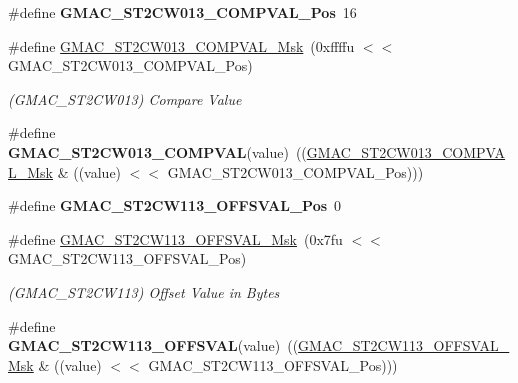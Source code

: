 \begin{DoxyCompactItemize}
\item 
\mbox{\label{group__SAMV71__GMAC_ga8e63dcd8385fa2aabb39af0bfb3d267a}} 
\#define {\bfseries G\+M\+A\+C\+\_\+\+S\+T2\+C\+W013\+\_\+\+C\+O\+M\+P\+V\+A\+L\+\_\+\+Pos}~16
\item 
\mbox{\label{group__SAMV71__GMAC_ga7d7fdcea04ba2bf079cc7801d1ef855a}} 
\#define \mbox{\hyperlink{group__SAMV71__GMAC_ga7d7fdcea04ba2bf079cc7801d1ef855a}{G\+M\+A\+C\+\_\+\+S\+T2\+C\+W013\+\_\+\+C\+O\+M\+P\+V\+A\+L\+\_\+\+Msk}}~(0xffffu $<$$<$ G\+M\+A\+C\+\_\+\+S\+T2\+C\+W013\+\_\+\+C\+O\+M\+P\+V\+A\+L\+\_\+\+Pos)
\begin{DoxyCompactList}\small\item\em (G\+M\+A\+C\+\_\+\+S\+T2\+C\+W013) Compare Value \end{DoxyCompactList}\item 
\mbox{\label{group__SAMV71__GMAC_gad017fa8197911182892a098e657eaaba}} 
\#define {\bfseries G\+M\+A\+C\+\_\+\+S\+T2\+C\+W013\+\_\+\+C\+O\+M\+P\+V\+AL}(value)~((\mbox{\hyperlink{group__SAMV71__GMAC_ga7d7fdcea04ba2bf079cc7801d1ef855a}{G\+M\+A\+C\+\_\+\+S\+T2\+C\+W013\+\_\+\+C\+O\+M\+P\+V\+A\+L\+\_\+\+Msk}} \& ((value) $<$$<$ G\+M\+A\+C\+\_\+\+S\+T2\+C\+W013\+\_\+\+C\+O\+M\+P\+V\+A\+L\+\_\+\+Pos)))
\item 
\mbox{\label{group__SAMV71__GMAC_gaa0e0b9bd4b2ba614240358f6e471edae}} 
\#define {\bfseries G\+M\+A\+C\+\_\+\+S\+T2\+C\+W113\+\_\+\+O\+F\+F\+S\+V\+A\+L\+\_\+\+Pos}~0
\item 
\mbox{\label{group__SAMV71__GMAC_ga798c1052db3859641ebedee42e9f9305}} 
\#define \mbox{\hyperlink{group__SAMV71__GMAC_ga798c1052db3859641ebedee42e9f9305}{G\+M\+A\+C\+\_\+\+S\+T2\+C\+W113\+\_\+\+O\+F\+F\+S\+V\+A\+L\+\_\+\+Msk}}~(0x7fu $<$$<$ G\+M\+A\+C\+\_\+\+S\+T2\+C\+W113\+\_\+\+O\+F\+F\+S\+V\+A\+L\+\_\+\+Pos)
\begin{DoxyCompactList}\small\item\em (G\+M\+A\+C\+\_\+\+S\+T2\+C\+W113) Offset Value in Bytes \end{DoxyCompactList}\item 
\mbox{\label{group__SAMV71__GMAC_ga305246dcf7a4d9dfbf436a75795506e9}} 
\#define {\bfseries G\+M\+A\+C\+\_\+\+S\+T2\+C\+W113\+\_\+\+O\+F\+F\+S\+V\+AL}(value)~((\mbox{\hyperlink{group__SAMV71__GMAC_ga798c1052db3859641ebedee42e9f9305}{G\+M\+A\+C\+\_\+\+S\+T2\+C\+W113\+\_\+\+O\+F\+F\+S\+V\+A\+L\+\_\+\+Msk}} \& ((value) $<$$<$ G\+M\+A\+C\+\_\+\+S\+T2\+C\+W113\+\_\+\+O\+F\+F\+S\+V\+A\+L\+\_\+\+Pos)))

\end{DoxyCompactItemize}
